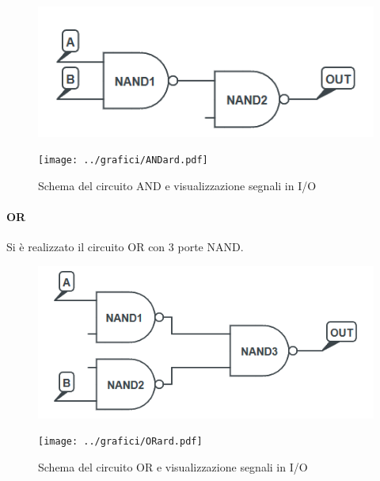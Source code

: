 \documentclass[a4paper,10pt]{article}
\begin{document}
\begin{figure}[H]
	\centering
	\begin{minipage}{0.49\textwidth}
		\centering
		\includegraphics[width=\textwidth]{../grafici/AND1.png}
	\end{minipage}
	\begin{minipage}{0.49\textwidth}
		\centering
		\texttt{[image: ../grafici/ANDard.pdf]}
	\end{minipage}
	\caption{Schema del circuito AND e visualizzazione segnali in I/O}
	\label{fig:AND}
\end{figure}

\paragraph{OR} Si è realizzato il circuito OR con 3 porte NAND.

\begin{figure}[H]
	\centering
	\begin{minipage}{0.49\textwidth}
		\centering
		\includegraphics[width=\textwidth]{../grafici/OR1.png}
	\end{minipage}
	\begin{minipage}{0.49\textwidth}
		\centering
		\texttt{[image: ../grafici/ORard.pdf]}
	\end{minipage}
	\caption{Schema del circuito OR e visualizzazione segnali in I/O}
	\label{fig:OR}
\end{figure}
\end{document}
